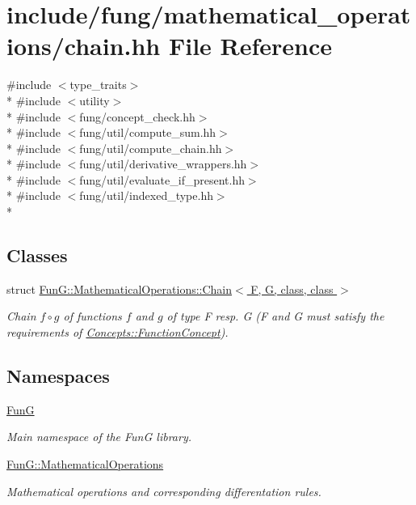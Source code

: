 \hypertarget{chain_8hh}{\section{include/fung/mathematical\-\_\-operations/chain.hh File Reference}
\label{chain_8hh}
}
{\ttfamily \#include $<$type\-\_\-traits$>$}\\*
{\ttfamily \#include $<$utility$>$}\\*
{\ttfamily \#include $<$fung/concept\-\_\-check.\-hh$>$}\\*
{\ttfamily \#include $<$fung/util/compute\-\_\-sum.\-hh$>$}\\*
{\ttfamily \#include $<$fung/util/compute\-\_\-chain.\-hh$>$}\\*
{\ttfamily \#include $<$fung/util/derivative\-\_\-wrappers.\-hh$>$}\\*
{\ttfamily \#include $<$fung/util/evaluate\-\_\-if\-\_\-present.\-hh$>$}\\*
{\ttfamily \#include $<$fung/util/indexed\-\_\-type.\-hh$>$}\\*
\subsection*{Classes}
\begin{DoxyCompactItemize}
\item 
struct \hyperlink{structFunG_1_1MathematicalOperations_1_1Chain}{Fun\-G\-::\-Mathematical\-Operations\-::\-Chain$<$ F, G, class, class $>$}
\begin{DoxyCompactList}\small\item\em Chain $ f\circ g $ of functions $f$ and $g$ of type F resp. G (F and G must satisfy the requirements of \hyperlink{structFunG_1_1Concepts_1_1FunctionConcept}{Concepts\-::\-Function\-Concept}). \end{DoxyCompactList}\end{DoxyCompactItemize}
\subsection*{Namespaces}
\begin{DoxyCompactItemize}
\item 
\hyperlink{namespaceFunG}{Fun\-G}
\begin{DoxyCompactList}\small\item\em Main namespace of the Fun\-G library. \end{DoxyCompactList}\item 
\hyperlink{namespaceFunG_1_1MathematicalOperations}{Fun\-G\-::\-Mathematical\-Operations}
\begin{DoxyCompactList}\small\item\em Mathematical operations and corresponding differentation rules. \end{DoxyCompactList}\end{DoxyCompactItemize}
